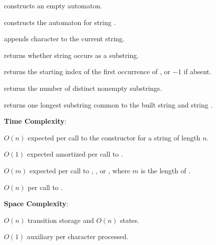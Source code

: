 \begin{compactitem}
  \item {} constructs an empty automaton.
  \item {} constructs the automaton for string .
  \item {} appends character  to the current string.
  \item {} returns whether string  occurs as a substring.
  \item {} returns the starting index of the first occurrence of , or $-1$ if absent.
  \item {} returns the number of distinct nonempty substrings.
  \item {} returns one longest substring common to the built string and string .
\end{compactitem}

\textbf{Time Complexity}:
\begin{compactitem}
  \item $O(n)$ expected per call to the constructor for a string of length $n$.
  \item $O(1)$ expected amortized per call to .
  \item $O(m)$ expected per call to , , or , where $m$ is the length of .
  \item $O(n)$ per call to .
\end{compactitem}

\textbf{Space Complexity}:
\begin{compactitem}
  \item $O(n)$ transition storage and $O(n)$ states.
  \item $O(1)$ auxiliary per character processed.
\end{compactitem}

